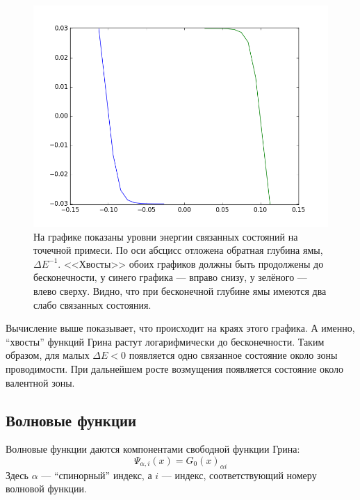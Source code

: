 \begin{figure}[h]
    \centering
    \includegraphics[width=0.8\linewidth]{impurity_levels.png}
    \caption{
            На графике показаны уровни энергии связанных состояний на точечной примеси. 
            По оси абсцисс отложена обратная глубина ямы, $\Delta E^{-1}$. <<Хвосты>>
            обоих графиков должны быть продолжены до бесконечности, у синего графика ---
            вправо снизу, у зелёного --- влево сверху. Видно,
            что при бесконечной глубине ямы имеются два слабо связанных состояния.
            }
\end{figure}

Вычисление выше показывает, что происходит на краях этого графика. А именно, ``хвосты'' 
функций Грина растут логарифмически до бесконечности.
Таким образом, для малых $\Delta E < 0$ появляется одно связанное состояние около 
зоны проводимости. При дальнейшем росте возмущения появляется состояние около валентной зоны.

\subsection{Волновые функции}
Волновые функции даются компонентами свободной
функции Грина:
\begin{equation}
    \Psi_{\alpha, i}(x) = G_0(x)_{\alpha i}
\end{equation}
Здесь $\alpha$ --- ``спинорный'' индекс, а $i$ --- индекс, соответствующий номеру волновой 
функции.

